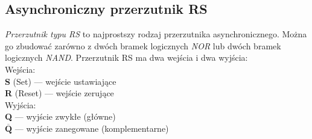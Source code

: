 \documentclass{article}
\begin{document}
    \subsection{Asynchroniczny przerzutnik RS}
      \textit{Przerzutnik typu RS} to najprostszy rodzaj przerzutnika asynchronicznego. Można go zbudować zarówno z dwóch bramek logicznych \textit{NOR} lub dwóch bramek logicznych \textit{NAND}. Przerzutnik RS ma dwa wejścia i dwa wyjścia: \\ 
      \pagebreak
      Wejścia: \\
      \textbf{S} (Set) --- wejście ustawiające \\
      \textbf{R} (Reset) --- wejście zerujące \\

      Wyjścia: \\
      \textbf{Q} --- wyjście zwykłe (główne) \\
      $\mathbf{\overline{Q}}$ --- wyjście zanegowane (komplementarne) \\
\end{document}
